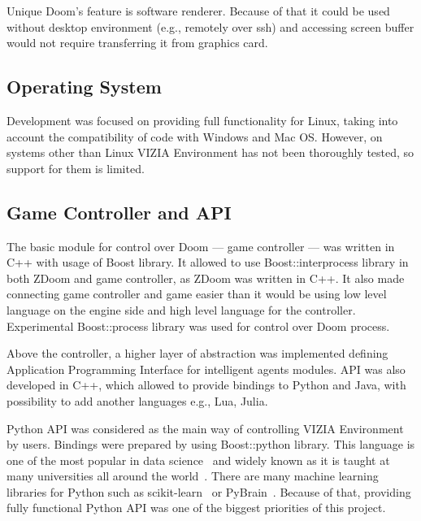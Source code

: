 Unique Doom's feature is software renderer. Because of that it could be used without desktop environment (e.g., remotely over ssh) and accessing screen buffer would not require transferring it from graphics card.

\subsection{Operating System}

Development was focused on providing full functionality for Linux, taking into account the compatibility of code with Windows and Mac OS.
However, on systems other than Linux VIZIA Environment has not been thoroughly tested, so support for them is limited.

\subsection{Game Controller and API}


The basic module for control over Doom --- game controller --- was written in C++ with usage of Boost library.
It allowed to use Boost::interprocess library in both ZDoom and game controller, as ZDoom was written in C++.
It also made connecting game controller and game easier than it would be using low level language on the engine side and high level language for the controller.
Experimental Boost::process library was used for control over Doom process.


Above the controller, a higher layer of abstraction was implemented defining Application Programming Interface for intelligent agents modules.
API was also developed in C++, which allowed to provide bindings to Python and Java, with possibility to add another languages e.g., Lua, Julia.


Python API was considered as the main way of controlling VIZIA Environment by users.
Bindings were prepared by using Boost::python library.
This language is one of the most popular in data science~\cite{ds_lang} and widely known as it is taught at many universities all around the world~\cite{pythons_schools}.
There are many machine learning libraries for Python such as scikit-learn~\cite{scikit} or PyBrain~\cite{pybrain}.
Because of that, providing fully functional Python API was one of the biggest priorities of this project.



